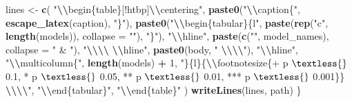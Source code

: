 \documentclass[
]{article}
\newenvironment{Shaded}{\begin{snugshade}}{\end{snugshade}}
\newcommand{\AttributeTok}[1]{\textcolor[rgb]{0.13,0.29,0.53}{#1}}
\newcommand{\DecValTok}[1]{\textcolor[rgb]{0.00,0.00,0.81}{#1}}
\newcommand{\FunctionTok}[1]{\textcolor[rgb]{0.13,0.29,0.53}{\textbf{#1}}}
\newcommand{\NormalTok}[1]{#1}
\newcommand{\OtherTok}[1]{\textcolor[rgb]{0.56,0.35,0.01}{#1}}
\newcommand{\SpecialCharTok}[1]{\textcolor[rgb]{0.81,0.36,0.00}{\textbf{#1}}}
\newcommand{\StringTok}[1]{\textcolor[rgb]{0.31,0.60,0.02}{#1}}
\begin{document}
\begin{Shaded}
\begin{Highlighting}[]
\NormalTok{    lines }\OtherTok{\textless{}{-}} \FunctionTok{c}\NormalTok{(}
        \StringTok{"}\SpecialCharTok{\textbackslash{}\textbackslash{}}\StringTok{begin\{table\}[!htbp]}\SpecialCharTok{\textbackslash{}\textbackslash{}}\StringTok{centering"}\NormalTok{,}
        \FunctionTok{paste0}\NormalTok{(}\StringTok{"}\SpecialCharTok{\textbackslash{}\textbackslash{}}\StringTok{caption\{"}\NormalTok{, }\FunctionTok{escape\_latex}\NormalTok{(caption), }\StringTok{"\}"}\NormalTok{),}
        \FunctionTok{paste0}\NormalTok{(}\StringTok{"}\SpecialCharTok{\textbackslash{}\textbackslash{}}\StringTok{begin\{tabular\}\{l"}\NormalTok{, }\FunctionTok{paste}\NormalTok{(}\FunctionTok{rep}\NormalTok{(}\StringTok{"c"}\NormalTok{, }\FunctionTok{length}\NormalTok{(models)), }\AttributeTok{collapse =} \StringTok{""}\NormalTok{), }\StringTok{"\}"}\NormalTok{),}
        \StringTok{"}\SpecialCharTok{\textbackslash{}\textbackslash{}}\StringTok{hline"}\NormalTok{,}
        \FunctionTok{paste}\NormalTok{(}\FunctionTok{c}\NormalTok{(}\StringTok{""}\NormalTok{, model\_names), }\AttributeTok{collapse =} \StringTok{" \& "}\NormalTok{),}
        \StringTok{"}\SpecialCharTok{\textbackslash{}\textbackslash{}\textbackslash{}\textbackslash{}}\StringTok{ }\SpecialCharTok{\textbackslash{}\textbackslash{}}\StringTok{hline"}\NormalTok{,}
        \FunctionTok{paste0}\NormalTok{(body, }\StringTok{" }\SpecialCharTok{\textbackslash{}\textbackslash{}\textbackslash{}\textbackslash{}}\StringTok{"}\NormalTok{),}
        \StringTok{"}\SpecialCharTok{\textbackslash{}\textbackslash{}}\StringTok{hline"}\NormalTok{,}
        \StringTok{"}\SpecialCharTok{\textbackslash{}\textbackslash{}}\StringTok{multicolumn\{"}\NormalTok{, }\FunctionTok{length}\NormalTok{(models) }\SpecialCharTok{+} \DecValTok{1}\NormalTok{, }\StringTok{"\}\{l\}\{}\SpecialCharTok{\textbackslash{}\textbackslash{}}\StringTok{footnotesize\{+ p $\textless{}$ 0.1, * p $\textless{}$ 0.05, ** p $\textless{}$ 0.01, *** p $\textless{}$ 0.001\}\} }\SpecialCharTok{\textbackslash{}\textbackslash{}\textbackslash{}\textbackslash{}}\StringTok{"}\NormalTok{,}
        \StringTok{"}\SpecialCharTok{\textbackslash{}\textbackslash{}}\StringTok{end\{tabular\}"}\NormalTok{,}
        \StringTok{"}\SpecialCharTok{\textbackslash{}\textbackslash{}}\StringTok{end\{table\}"}
\NormalTok{    )}
    \FunctionTok{writeLines}\NormalTok{(lines, path)}
\NormalTok{\}}


\end{Highlighting}
\end{Shaded}
\end{document}
